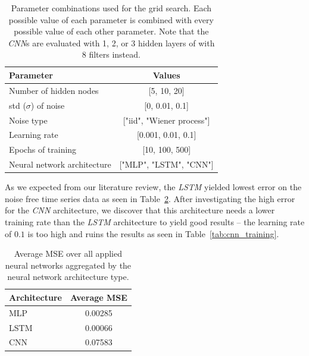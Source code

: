 \documentclass{article}
\begin{document}
\begin{table}
    \centering
    \begin{tabular}{l|c}
        Parameter                   & Values                    \\
        \hline
        Number of hidden nodes      & [5, 10, 20]               \\
        std ($\sigma$) of noise     & [0, 0.01, 0.1]            \\
        Noise type                  & ["iid", "Wiener process"] \\
        Learning rate               & [0.001, 0.01, 0.1]        \\
        Epochs of training          & [10, 100, 500]            \\
        Neural network architecture & ["MLP", "LSTM", "CNN"]    \\
    \end{tabular}
    \caption{Parameter combinations used for the grid search. Each possible value
        of each parameter is combined with every possible value of each other
        parameter. Note that the \emph{CNN}s are evaluated with 1, 2, or 3 hidden
        layers of with 8 filters instead.}
    \label{tab:gridparameters}
\end{table}

As we expected from our literature review, the \emph{LSTM} yielded lowest error
on the noise free time series data as seen in Table~\ref{tab:noisefree_result}.
After investigating the high error for the \emph{CNN} architecture, we discover
that this architecture needs a lower training rate than the \emph{LSTM}
architecture to yield good results -- the learning rate of $0.1$ is too high
and ruins the results as seen in Table~\ref{tab:cnn_training}.

\begin{table}
    \centering
    \begin{tabular}{l|c}
        Architecture & Average MSE \\
        \hline
        MLP          & 0.00285     \\
        LSTM         & 0.00066     \\
        CNN          & 0.07583     \\
    \end{tabular}
    \caption{Average MSE over all applied neural networks aggregated by
        the neural network architecture type.}
    \label{tab:noisefree_result}
\end{table}
\end{document}
